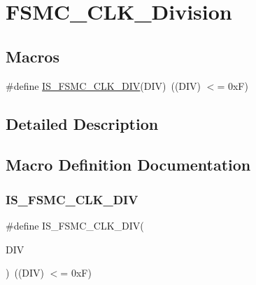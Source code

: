 \hypertarget{group___f_s_m_c___c_l_k___division}{}\section{F\+S\+M\+C\+\_\+\+C\+L\+K\+\_\+\+Division}
\label{group___f_s_m_c___c_l_k___division}
\subsection*{Macros}
\begin{DoxyCompactItemize}
\item 
\#define \mbox{\hyperlink{group___f_s_m_c___c_l_k___division_ga9e5321b02ea049fd076ba705acd06b5f}{I\+S\+\_\+\+F\+S\+M\+C\+\_\+\+C\+L\+K\+\_\+\+D\+IV}}(D\+IV)~((D\+IV) $<$= 0x\+F)
\end{DoxyCompactItemize}


\subsection{Detailed Description}


\subsection{Macro Definition Documentation}
\mbox{\label{group___f_s_m_c___c_l_k___division_ga9e5321b02ea049fd076ba705acd06b5f}} 
\subsubsection{\texorpdfstring{IS\_FSMC\_CLK\_DIV}{IS\_FSMC\_CLK\_DIV}}
{\footnotesize\ttfamily \#define I\+S\+\_\+\+F\+S\+M\+C\+\_\+\+C\+L\+K\+\_\+\+D\+IV(\begin{DoxyParamCaption}\item[{}]{D\+IV }\end{DoxyParamCaption})~((D\+IV) $<$= 0x\+F)}

